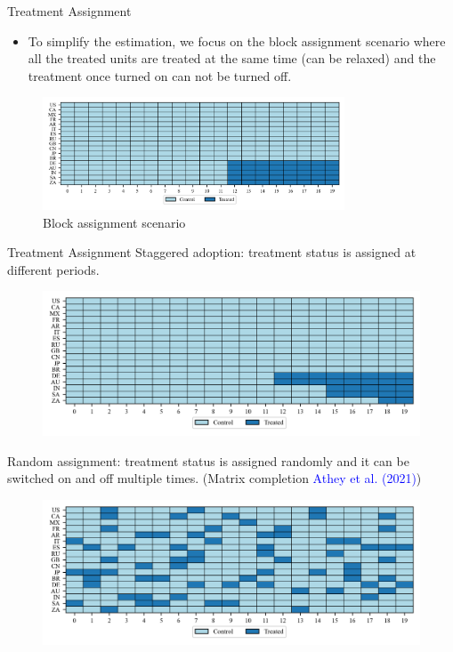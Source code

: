 \documentclass{beamer}
\begin{document}
\begin{frame}{Treatment Assignment}
\begin{itemize}
    \item To simplify the estimation, we focus on the block assignment scenario where all the treated units are treated at the same time 
    (can be relaxed) and the treatment once turned on can not be turned off.
\end{itemize}
\begin{figure}
    \centering
    \includegraphics[width=0.8\textwidth]{figs/block_assignment.png}
    \caption{Block assignment scenario}
\end{figure}
\end{frame}

\begin{frame}{Treatment Assignment}
Staggered adoption: treatment status is assigned at different periods. 
\begin{figure}
    \centering
    \includegraphics[scale=0.45]{figs/staggered_adoption.png}
\end{figure}  

Random assignment: treatment status is assigned randomly and it can be switched on and off multiple times. (Matrix completion \textcolor{blue}{Athey et al. (2021)})
\begin{figure}
    \centering
    \includegraphics[scale=0.45]{figs/random_assignment.png}
\end{figure} 
\end{frame}
\end{document}
